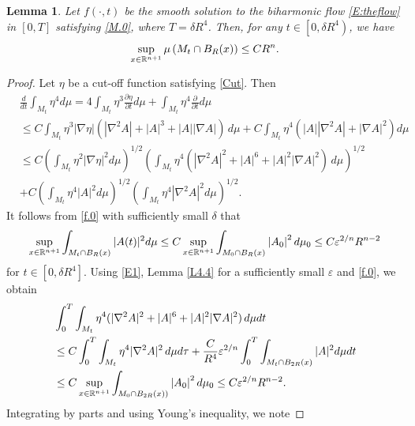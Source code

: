 \documentclass{amsart}
\newtheorem{lemma}[theorem]{Lemma}
\theoremstyle{definition}
\def\R{{\Bbb R}}
\numberwithin{equation}{section}
\begin{document}
 \begin{lemma} \label{Vo}
  Let $f(\cdot, t)$ be the smooth solution to the biharmonic flow \eqref{E:theflow} in $[0,  T]$ satisfying \eqref{M.0}, where $T=\delta
  R^4$.
Then,  for any $t\in \left[ 0, \delta R^4\right)$, we have
\begin{align*}
\sup_{x\in \R^{n+1}}\mu \left (  M_t\cap B_{R}(x)\right )\leq CR^n.
\end{align*}
\end{lemma}
\begin{proof}
Let $\eta$ be a cut-off function satisfying \eqref{Cut}.  Then
\begin{align} \label{5.1.1}
  & \frac d{d t} \int_{M_t}  \eta ^{4} d\mu = 4 \int_{M_t}  \eta ^{3}   \frac {\partial\eta}{\partial t} d\mu +\int_{M_t}  \eta ^{4} \frac \partial{\partial t} d\mu \\
  &  \leq    C\int_{M_t}  \eta ^{3}|\nabla \eta| (|\nabla^2A|+|A|^3+|A| |\nabla A|) \, d\mu  +C\int_{M_t}  \eta ^{4} (|A| |\nabla^2 A| + |\nabla
  A|^2) d\mu\nonumber\\
  &\leq  C(\int_{M_t}  \eta ^{2}|\nabla \eta |^2 d\mu )^{1/2}\left (\int_{M_t}  \eta ^4 (|\nabla^2A|^2+|A|^6+|A|^2 |\nabla A|^2) \, d\mu \right
  )^{1/2\nonumber}\\
  &+C \left (\int_{M_t}  \eta ^{4} |A|^2 d\mu\right )^{1/2} \left (\int_{M_t}  \eta ^{4}   |\nabla^2 A|^2  d\mu\right )^{1/2}.\nonumber
\end{align}
It follows from \eqref{f.0} with sufficiently small $\delta$   that
 \begin{align} \label{5.1.2}
\sup_{x\in \R^{n+1}} \int_{  M_t\cap B_{R}(x)}  |A(t)|^2 d\mu  \leq C\sup_{x\in \R^{n+1}} \int_{  M_0\cap B_{R}(x)} \left| A_{0} \right|^{2}
d\mu_{0}\leq C\varepsilon^{2/n} R^{n-2} \end{align}
for $t\in [0,\delta R^4]$.
Using \eqref{E1}, Lemma \ref{L4.4} for a sufficiently small $\varepsilon$ and \eqref{f.0}, we obtain
\begin{align} \label{5.1.3}
  & \int_0^T \int_{M_t}  \eta ^4 (|\nabla^2A|^2+|A|^6+|A|^2 |\nabla A|^2) \, d\mu d t \\
  &\leq C\int_0^T \int_{M_t}  \eta ^4 |\nabla^2A|^2 \, d\mu d\tau+ \frac C{R^4} \varepsilon^{2/n}\int_0^T \int_{  M_t\cap B_{2R}(x)} |  A|^{2}
  d\mu d t\nonumber\\
  &\leq C\sup_{x\in \R^{n+1}} \int_{  M_0\cap B_{2R}(x) )} \left| A_{0} \right|^{2} d\mu_{0}\leq C\varepsilon^{2/n} R^{n-2}.\nonumber
\end{align}
Integrating by parts and using Young's inequality,  we note

\end{proof}
\end{document}
